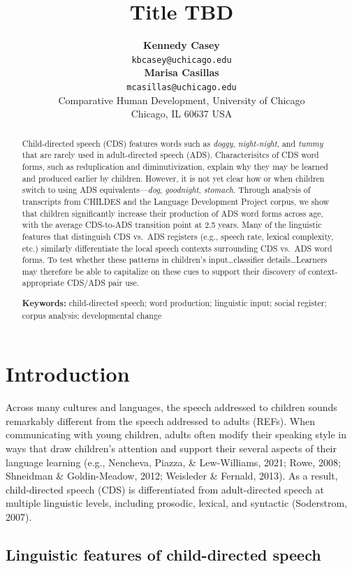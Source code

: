 \documentclass[10pt, letterpaper]{article}
\title{Title TBD}
\author{{\large \bf Kennedy Casey} \\ \texttt{\small{kbcasey@uchicago.edu}}  \\{\large \bf Marisa Casillas} \\ \texttt{\small{mcasillas@uchicago.edu}} \\Comparative Human Development, University of Chicago \\ Chicago, IL 60637 USA}
\begin{document}
\maketitle

\begin{abstract}
Child-directed speech (CDS) features words such as \emph{doggy},
\emph{night-night}, and \emph{tummy} that are rarely used in
adult-directed speech (ADS). Characterisitcs of CDS word forms, such as
reduplication and diminutivization, explain why they may be learned and
produced earlier by children. However, it is not yet clear how or when
children switch to using ADS equivalents---\emph{dog}, \emph{goodnight},
\emph{stomach}. Through analysis of transcripts from CHILDES and the
Language Development Project corpus, we show that children significantly
increase their production of ADS word forms across age, with the average
CDS-to-ADS transition point at 2.5 years. Many of the linguistic
features that distinguish CDS vs.~ADS registers (e.g., speech rate,
lexical complexity, etc.) similarly differentiate the local speech
contexts surrounding CDS vs.~ADS word forms. To test whether these
patterns in children's input\ldots classifier details\ldots Learners may
therefore be able to capitalize on these cues to support their discovery
of context-appropriate CDS/ADS pair use.

\textbf{Keywords:}
child-directed speech; word production; linguistic input; social
register; corpus analysis; developmental change
\end{abstract}

\hypertarget{introduction}{%
\section{Introduction}\label{introduction}}

Across many cultures and languages, the speech addressed to children
sounds remarkably different from the speech addressed to adults (REFs).
When communicating with young children, adults often modify their
speaking style in ways that draw children's attention and support their
several aspects of their language learning (e.g., Nencheva, Piazza, \&
Lew-Williams, 2021; Rowe, 2008; Shneidman \& Goldin-Meadow, 2012;
Weisleder \& Fernald, 2013). As a result, child-directed speech (CDS) is
differentiated from adult-directed speech at multiple linguistic levels,
including prosodic, lexical, and syntactic (Soderstrom, 2007).

\hypertarget{linguistic-features-of-child-directed-speech}{%
\subsection{Linguistic features of child-directed
speech}\label{linguistic-features-of-child-directed-speech}}
\end{document}
